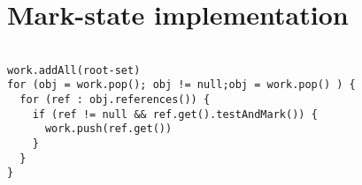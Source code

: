 \section{Mark-state implementation}
\label{sec:ms:state}




\begin{lstlisting}[name=Mark Phase, 
                   caption=\lstname: pseudo-code for mark-sweep,
                   label=fig:ms:pseudo]
                   
work.addAll(root-set)
for (obj = work.pop(); obj != null;obj = work.pop() ) {
  for (ref : obj.references()) {
    if (ref != null && ref.get().testAndMark()) {
      work.push(ref.get())
    }
  }
}
\end{lstlisting}

